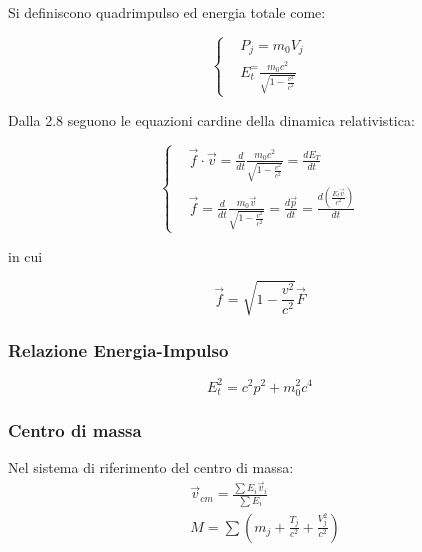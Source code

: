 \documentclass{article}
\begin{document}
Si definiscono quadrimpulso ed energia totale come:

\begin{equation}
    \left\{
    \begin{aligned}
         & P_j=m_0V_j                                    \\
         & E_t^= \frac{m_0c^2}{\sqrt{1-\frac{v^2}{c^2}}}
    \end{aligned}
    \right.
\end{equation}

Dalla 2.8 seguono le equazioni cardine della dinamica relativistica:

\begin{equation}
    \left\{
    \begin{aligned}
         & \vec{f}\cdot\vec{v}=\frac{d}{dt}\frac{m_0c^2}{\sqrt{1-\frac{v^2}{c^2}}}= \frac{d E_T}{dt}                                  \\
         & \vec{f}=\frac{d}{dt}\frac{m_0\vec{v}}{\sqrt{1-\frac{v^2}{c^2}}}=\frac{d \vec{p}}{dt}=\frac{d (\frac{E_t\vec{v}}{c^2})}{dt}
    \end{aligned}
    \right.
\end{equation}

in cui

\begin{equation}
    \vec{f}=\sqrt{1-\frac{v^2}{c^2}}\vec{F}
\end{equation}

\subsubsection{Relazione Energia-Impulso}

\begin{equation}
    E_t^2=c^2p^2+m_0^2c^4
\end{equation}

\subsubsection*{Centro di massa}
Nel sistema di riferimento del centro di massa:
\begin{equation}
    \begin{aligned}
         & \vec{v}_{cm}=\frac{\sum E_i\vec{v}_i}{\sum E_i} \\
         & M= \sum(m_j+\frac{T_j}{c^2}+\frac{V_j^2}{c^2})
    \end{aligned}
\end{equation}
\end{document}
